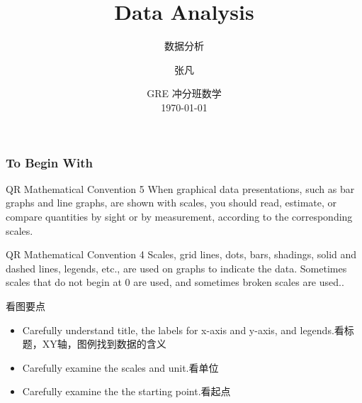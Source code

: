 \documentclass[
	11pt, %
	handout,
]{beamer}
\title[Data Analysis]{Data Analysis} %
\subtitle{数据分析} %
\author[张凡]{张凡} %
\institute[XDF]{新东方国际教育 \\ \smallskip \textit{zhangfan@xdf.cn}} %
\date[\today]{GRE 冲分班数学 \\ \today} %
\begin{document}

\begin{frame}
	\titlepage %
\end{frame}



\begin{frame}
	\frametitle{To Begin With} %

	\begin{block}{QR Mathematical Convention 5}
		When graphical data presentations, such as bar graphs and line graphs,
are shown with scales, you should read, estimate, or compare quantities
by sight or by measurement, according to the corresponding scales.
	\end{block}

		\begin{block}{QR Mathematical Convention 4}
		Scales, grid lines, dots, bars, shadings, solid and dashed lines, legends,
etc., are used on graphs to indicate the data. Sometimes scales that do not
begin at 0 are used, and sometimes broken scales are used..
	\end{block}
	\begin{alertblock}{看图要点}
		\begin{itemize}
			\item Carefully understand title, the labels for x-axis and y-axis, and legends.看标题，XY轴，图例找到数据的含义
			\item Carefully examine the scales and unit.看单位
			\item Carefully examine the the starting point.看起点
		\end{itemize}
	\end{alertblock}
\end{frame}

\end{document}
